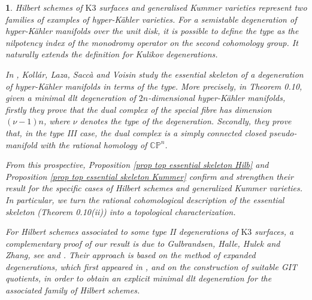 \documentclass{amsart}%
\numberwithin{equation}{subsection}
\theoremstyle{plain2}
\theoremstyle{definition2}
\theoremstyle{stepstyle}
\theoremstyle{point}
\theoremstyle{subpoint}
\newtheorem{subpoint}[equation]{}%
\newcommand{\spa}[1]{\begin{subpoint}#1\end{subpoint}}           %
\newcommand{\CP}{\ensuremath{\mathbb{CP}}}
\begin{document}
\spa{Hilbert schemes of $\text{K}3$ surfaces and generalised Kummer varieties represent two families of examples of hyper-K\"{a}hler varieties. For a semistable degeneration of hyper-K\"{a}hler manifolds over the unit disk, it is possible to define the type as the nilpotency index of the monodromy operator on the second cohomology group. It naturally extends the definition for Kulikov degenerations.

In \cite{KollarLazaSaccaEtAl2017}, Koll\'{a}r, Laza, Sacc\`{a} and Voisin study the essential skeleton of a degeneration of hyper-K\"{a}hler manifolds in terms of the type. More precisely, in Theorem 0.10, given a minimal dlt degeneration of $2n$-dimensional hyper-K\"{a}hler manifolds, firstly they prove that the dual complex of the special fibre has dimension $(\nu-1)n$, where $\nu$ denotes the type of the degeneration. Secondly, they prove that, in the type III case, the dual complex is a simply connected closed pseudo-manifold with the rational homology of $\CP^n$.

From this prospective, Proposition \ref{prop top essential skeleton Hilb} and Proposition \ref{prop top essential skeleton Kummer} confirm and strengthen their result for the specific cases of Hilbert schemes and generalized Kummer varieties. In particular, we turn the rational cohomological description of the essential skeleton (Theorem 0.10(ii)) into a topological characterization.

For Hilbert schemes associated to some type II degenerations of $\text{K}3$ surfaces, a complementary proof of our result is due to Gulbrandsen, Halle, Hulek and Zhang, see \cite{GulbrandsenHalleHulek2016} and \cite{GulbrandsenHalleHulekEtAl}. Their approach is based on the method of \textit{expanded degenerations}, which first appeared in \cite{Li}, and on the construction of suitable GIT quotients, in order to obtain an explicit minimal dlt degeneration for the associated family of Hilbert schemes.
}
\end{document}
